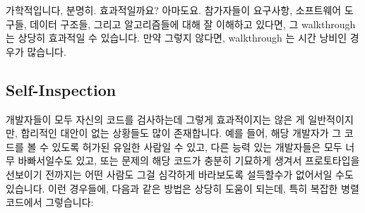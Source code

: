 가학적입니다, 분명히.
효과적일까요?
아마도요.
참가자들이 요구사항, 소프트웨어 도구들, 데이터 구조들, 그리고 알고리즘들에 대해
잘 이해하고 있다면, 그 walkthrough 는 상당히 효과적일 수 있습니다.
만약 그렇지 않다면, walkthrough 는 시간 낭비인 경우가 많습니다.

\subsection{Self-Inspection}
\label{sec:debugging:Self-Inspection}

개발자들이 모두 자신의 코드를 검사하는데 그렇게 효과적이지는 않은 게
일반적이지만, 합리적인 대안이 없는 상황들도 많이 존재합니다.
예를 들어, 해당 개발자가 그 코드를 볼 수 있도록 허가된 유일한 사람일 수 있고,
다른 능력 있는 개발자들은 모두 너무 바빠서일수도 있고, 또는 문제의 해당 코드가
충분히 기묘하게 생겨서 프로토타입을 선보이기 전까지는 어떤 사람도 그걸 심각하게
바라보도록 설득할수가 없어서일 수도 있습니다.
이런 경우들에, 다음과 같은 방법은 상당히 도움이 되는데, 특히 복잡한 병렬
코드에서 그렇습니다:

